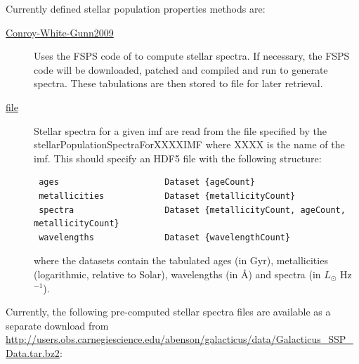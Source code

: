 Currently defined stellar population properties methods are:
\begin{description}
 \item [\hyperlink{stellar_populations.spectra.Conroy_et_al.F90:stellar_population_spectra_conroy}{{\normalfont \ttfamily Conroy-White-Gunn2009}}] Uses the {\normalfont \ttfamily FSPS} code of \cite{conroy_propagation_2009} to compute stellar spectra. If necessary, the {\normalfont \ttfamily FSPS} code will be downloaded, patched and compiled and run to generate spectra. These tabulations are then stored to file for later retrieval.
 \item [\hyperlink{stellar_populations.spectra.file.F90:stellar_population_spectra_file}{{\normalfont \ttfamily file}}] Stellar spectra for a given \gls{imf} are read from the file specified by the {\normalfont \ttfamily stellarPopulationSpectraForXXXXIMF} where {\normalfont \ttfamily XXXX} is the name of the \gls{imf}. This should specify an HDF5 file with the following structure:
\begin{verbatim}
 ages                     Dataset {ageCount}
 metallicities            Dataset {metallicityCount}
 spectra                  Dataset {metallicityCount, ageCount, metallicityCount}
 wavelengths              Dataset {wavelengthCount}
\end{verbatim}
where the datasets contain the tabulated ages (in Gyr), metallicities (logarithmic, relative to Solar), wavelengths (in \AA) and spectra (in $L_\odot$ Hz$^{-1}$).
\end{description}
Currently, the following pre-computed stellar spectra files are available as a separate download from \href{http://users.obs.carnegiescience.edu/abenson/galacticus/data/Galacticus_SSP_Data.tar.bz2}{\normalfont \ttfamily http://users.obs.carnegiescience.edu/abenson/galacticus/data/Galacticus\_SSP\_Data.tar.bz2}:
